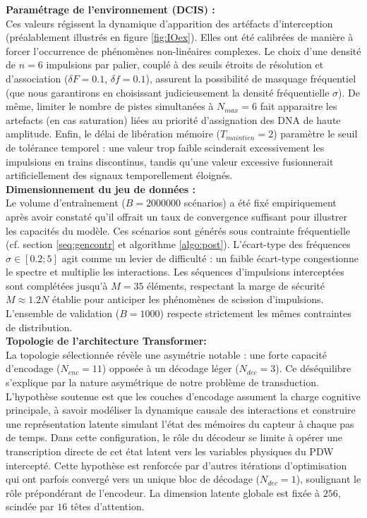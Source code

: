 \noindent \textbf{Paramétrage de l'environnement (DCIS) :}\\
Ces valeurs régissent la dynamique d'apparition des artéfacts d'interception (préalablement illustrés en figure \ref{fig:IOex}). Elles ont été calibrées de manière à forcer l'occurrence de phénomènes non-linéaires complexes. Le choix d'une densité de $n=6$ impulsions par palier, couplé à des seuils étroits de résolution et d'association ($\delta F = 0.1$, $\delta f = 0.1$), assurent la possibilité de masquage fréquentiel (que nous garantirons en choisissant judicieusement la densité fréquentielle $\sigma$). De même, limiter le nombre de pistes simultanées à $N_{max} = 6$ fait apparaitre les artefacts (en cas saturation) liées au priorité d'assignation des DNA de haute amplitude. Enfin, le délai de libération mémoire ($T_{maintien}=2$) paramètre le seuil de tolérance temporel : une valeur trop faible scinderait excessivement les impulsions en trains discontinus, tandis qu'une valeur excessive fusionnerait artificiellement des signaux temporellement éloignés.\\

\noindent \textbf{Dimensionnement du jeu de données :}\\
Le volume d'entraînement ($B = 2000000$ scénarios) a été fixé empiriquement après avoir constaté qu'il offrait un taux de convergence suffisant pour illustrer les capacités du modèle. Ces scénarios sont générés sous contrainte fréquentielle (cf. section \ref{seq:gencontr} et algorithme \ref{algo:post}). L'écart-type des fréquences $\sigma \in [0.2; 5]$ agit comme un levier de difficulté : un faible écart-type congestionne le spectre et multiplie les interactions. Les séquences d'impulsions interceptées sont complétées jusqu'à $M = 35$ éléments, respectant la marge de sécurité $M \approx 1.2N$ établie pour anticiper les phénomènes de scission d'impulsions. L'ensemble de validation ($B = 1000$) respecte strictement les mêmes contraintes de distribution.\\

\noindent \textbf{Topologie de l'architecture Transformer:}\\
La topologie sélectionnée révèle une asymétrie notable : une forte capacité d'encodage ($N_{enc}=11$) opposée à un décodage léger ($N_{dec}=3$). Ce déséquilibre s'explique par la nature asymétrique de notre problème de transduction. L'hypothèse soutenue est que les couches d'encodage assument la charge cognitive principale, à savoir modéliser la dynamique causale des interactions et construire une représentation latente simulant l'état des mémoires du capteur à chaque pas de temps. Dans cette configuration, le rôle du décodeur se limite à opérer une transcription directe de cet état latent vers les variables physiques du PDW intercepté. Cette hypothèse est renforcée par d'autres itérations d'optimisation qui ont parfois convergé vers un unique bloc de décodage ($N_{dec}=1$), soulignant le rôle prépondérant de l'encodeur. La dimension latente globale est fixée à $256$, scindée par $16$ têtes d'attention.\\

